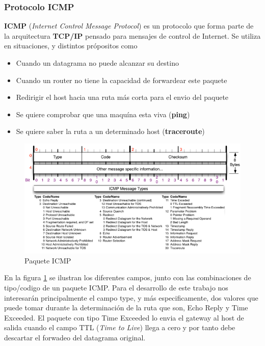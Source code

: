 \subsubsection{Protocolo \textbf{ICMP}}

\textbf{ICMP}\cite{rfc792} (\emph{Internet Control Message Protocol}) es un protocolo que
forma parte de la arquitectura \textbf{TCP/IP} pensado para mensajes de control
de Internet. Se utiliza en situaciones, y distintos própositos como

\begin{itemize}
	\item Cuando un datagrama no puede alcanzar su destino
	\item Cuando un router no tiene la capacidad de forwardear este paquete
	\item Redirigir el host hacia una ruta más corta para el envio del paquete
	\item Se quiere comprobar que una maquína esta viva (\textbf{ping})
	\item Se quiere saber la ruta a un determinado host (\textbf{traceroute})
\end{itemize}

\begin{figure}[ht]
	\begin{center}
		\includegraphics[width=0.8\columnwidth]{imagenes/icmp.png}
		\caption{Paquete ICMP}
		\label{fig:picmp}
	\end{center}
\end{figure}

En la figura \ref{fig:picmp} se ilustran los diferentes campos, junto con
las combinaciones de tipo/codigo de un paquete
ICMP. Para el desarrollo de este trabajo nos interesarán principalmente
el campo type, y más especificamente, dos valores que puede tomar durante
la determinación de la ruta que son, Echo Reply y
Time Exceeded. El paquete con tipo Time Exceeded lo envia el gateway al host
de salida cuando el campo TTL (\emph{Time to Live}) llega a cero y
por tanto debe descartar el forwadeo del datagrama original.


